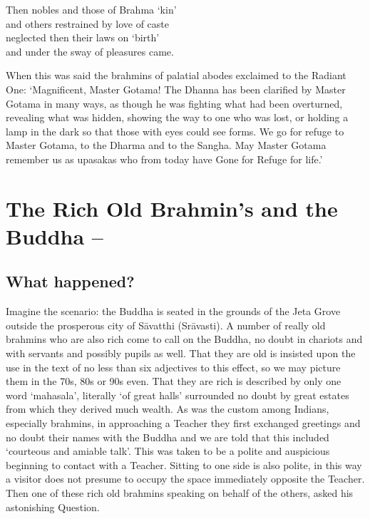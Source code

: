 \begin{MyDescription}{}
Then nobles and those of Brahma `kin'\\
and others restrained by love of caste\\
neglected then their laws on `birth'\\
and under the sway of pleasures came.
\end{MyDescription}   
 
When this was said the brahmins of palatial abodes exclaimed to the Radiant One: `Magnificent, Master Gotama! The Dhanna has been clarified by Master Gotama in many ways, as though he was fighting what had been overturned, revealing what was hidden, showing the way to one who was lost, or holding a lamp in the dark so that those with eyes could see forms. We go for refuge to Master Gotama, to the Dharma and to the Sangha. May Master Gotama remember us as upasakas who from today have Gone for Refuge for life.'

\begin{MyDescription}[(Sn. 284-315)]{}
\end{MyDescription}   

\newpage

\section{The Rich Old Brahmin's and the Buddha --}
\subsection{What happened?}
Imagine the scenario: the Buddha is seated in the grounds of the Jeta Grove outside the prosperous city of S\=avatthi (Sr\=avasti). A number of really old brahmins who are also rich come to call on the Buddha, no doubt in chariots and with servants and possibly pupils as well. That they are old is insisted upon the use in the text of no less than six adjectives to this effect, so we may picture them in the 70s, 80s or 90s even. That they are rich is described by only one word `mahasala', literally `of great halls' surrounded no doubt by great estates from which they derived much wealth. As was the custom among Indians, especially brahmins, in approaching a Teacher they ﬁrst exchanged greetings and no doubt their names with the Buddha and we are told that this included `courteous and amiable talk'. This was taken to be a polite and auspicious beginning to contact with a Teacher. Sitting to one side is also polite, in this way a visitor does not presume to occupy the space immediately opposite the Teacher. Then one of these rich old brahmins speaking on behalf of the others, asked his astonishing Question.\\

